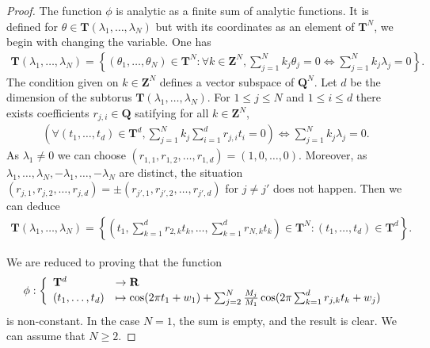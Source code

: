 \documentclass[a4paper,10pt]{amsart}
\theoremstyle{plain}
\theoremstyle{definition}
\begin{document}
\begin{proof}
The function $\phi$ is analytic as a finite sum of analytic functions.
It is defined for $\theta \in \mathbf{T}(\lambda_{1},\ldots,\lambda_{N})$ but with its coordinates as an element of $\mathbf{T}^{N}$, 
we begin with changing the variable.
One has
\begin{align*}
\mathbf{T}(\lambda_{1},\ldots,\lambda_{N}) = \left\lbrace (\theta_{1},\ldots,\theta_{N}) \in \mathbf{T}^{N} : \forall k\in\mathbf{Z}^{N},
\sum_{j=1}^{N} k_{j}\theta_{j} = 0 \Leftrightarrow \sum_{j=1}^{N} k_{j}\lambda_{j} = 0 \right\rbrace.
\end{align*} 
The condition given on $k\in\mathbf{Z}^{N}$ defines a vector subspace of $\mathbf{Q}^{N}$.
Let $d$ be the dimension of the subtorus $\mathbf{T}(\lambda_{1},\ldots,\lambda_{N})$.
For $1\leq j\leq N$ and $1\leq i \leq d$ there exists coefficients $r_{j,i} \in \mathbf{Q}$
satifying for all $k\in\mathbf{Z}^{N}$,
\begin{align*}
\left( \forall (t_{1},\ldots,t_{d}) \in \mathbf{T}^{d},
\sum_{j=1}^{N} k_{j}\sum_{i=1}^{d}r_{j,i}t_{i} = 0 \right) \Leftrightarrow \sum_{j=1}^{N} k_{j}\lambda_{j} = 0.
\end{align*}
As $\lambda_{1} \neq 0$ we can choose $(r_{1,1},r_{1,2},\ldots,r_{1,d}) = (1,0,\ldots,0)$.
Moreover, as $\lambda_{1},\ldots,\lambda_{N},-\lambda_{1},\ldots,-\lambda_{N}$ are distinct, the situation 
$(r_{j,1},r_{j,2},\ldots,r_{j,d})= \pm (r_{j',1},r_{j',2},\ldots,r_{j',d})$ for $j\neq j'$ does not happen.
Then we can deduce
\begin{align*}
\mathbf{T}(\lambda_{1},\ldots,\lambda_{N}) = \left\lbrace \left(t_{1},\sum_{k=1}^{d}r_{2,k}t_{k},\ldots,\sum_{k=1}^{d}r_{N,k}t_{k}\right) \in \mathbf{T}^{N} : (t_{1},\ldots,t_{d}) \in \mathbf{T}^{d}\right\rbrace.
\end{align*} 

We are reduced to proving that the function
$$\phi : \left\lbrace
\begin{array}{l l}
\mathbf{T}^{d} & \rightarrow \mathbf{R} \\
(t_{1},\ldots,t_{d}) &\mapsto \cos(2\pi t_{1} + w_{1}) + \sum_{j=2}^{N}\frac{M_{j}}{M_{1}}\cos(2\pi\sum_{k=1}^{d}r_{j,k}t_{k} + w_{j})
\end{array}
\right.$$
is non-constant.
In the case $N=1$, the sum is empty, and the result is clear.
We can assume that $N\geq 2$.


\end{proof}
\end{document}
